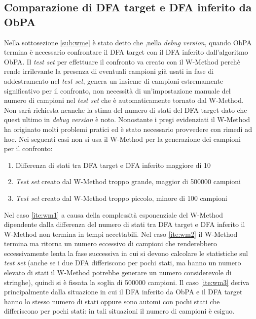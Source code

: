 \subsection[Valutazione DFA inferito]{Comparazione di DFA target e DFA inferito da ObPA}
Nella sottosezione \ref{sub:wme} è stato detto che ,nella \textit{debug version}, quando \ac{ObPA} termina è necessario confrontare il \ac{DFA} target con il \ac{DFA} inferito dall'algoritmo \ac{ObPA}. Il \textit{test set} per effettuare il confronto va creato con il W-Method perchè rende irrilevante la presenza di eventuali campioni già usati in fase di addestramento nel \textit{test set}, genera un insieme di campioni estremamente significativo per il confronto, non necessità di un'impostazione manuale del numero di campioni nel \textit{test set} che è automaticamente tornato dal W-Method. Non sarà richiesta neanche la stima del numero di stati del \ac{DFA} target dato che quest ultimo in \textit{debug version} è noto. Nonostante i pregi evidenziati il W-Method ha originato molti problemi pratici ed è stato necessario provvedere con rimedi ad hoc. Nei seguenti casi non si usa il W-Method per la generazione dei campioni per il confronto:
\begin{enumerate}
\item \label{ite:wm1}Differenza di stati tra \ac{DFA} target e \ac{DFA} inferito maggiore di 10
\item \label{ite:wm2} \textit{Test set} creato dal W-Method troppo grande, maggior di 500000 campioni
\item \label{ite:wm3} \textit{Test set} creato dal W-Method troppo piccolo, minore di 100 campioni
\end{enumerate}
 Nel caso \ref{ite:wm1} a causa della complessità esponenziale del W-Method dipendente dalla differenza del numero di stati tra \ac{DFA} target e \ac{DFA} inferito il W-Method non termina in tempi accettabili. Nel caso \ref{ite:wm2} il W-Method termina ma ritorna un numero eccessivo di campioni che renderebbero eccessivamente lenta la fase successiva in cui si devono calcolare le statistiche sul \textit{test set} (anche se i due \ac{DFA} differiscono per pochi stati, ma hanno un numero elevato di stati il W-Method potrebbe generare un numero considerevole di stringhe), quindi si è fissata la soglia di 500000 campioni.  Il caso \ref{ite:wm3} deriva principalmente dalla situazione in cui il \ac{DFA} inferito da \ac{ObPA} e il \ac{DFA} target hanno lo stesso numero di stati oppure sono automi con pochi stati che differiscono per pochi stati: in tali situazioni il numero di campioni è esiguo.
 

